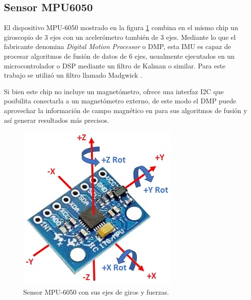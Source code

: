 
\subsection{Sensor MPU6050}\label{sec:mpu6050}

El dispositivo MPU-6050 mostrado en la figura \ref{fig:mpu6050} combina en el mismo chip un giroscopio de 3 ejes con un acelerómetro también de 3 ejes. Mediante lo que el fabricante denomina \textit{Digital Motion Processor} o DMP, esta IMU es capaz de procesar algoritmos de fusión de datos de 6 ejes, usualmente ejecutados en un microcontrolador o DSP mediante un filtro de Kalman o similar. Para este trabajo se utilizó un filtro llamado Madgwick \citep{PAPER:4}.

Si bien este chip no incluye un magnetómetro, ofrece una interfaz I2C que posibilita conectarla a un magnetómetro externo, de este modo el DMP puede aprovechar la información de campo magnético en para sus algoritmos de fusión y así generar resultados más precisos.

\begin{figure}[ht]
    \centering
    \includegraphics[scale=0.5]{./Figures/mpu6050.jpg}
    \caption{Sensor MPU-6050 con sus ejes de giros y fuerzas\protect\footnotemark.}
    \label{fig:mpu6050}
\end{figure}


